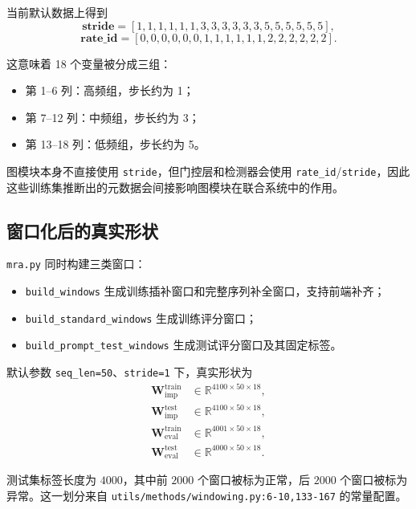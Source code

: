 \documentclass[UTF8]{ctexart}
\begin{document}
当前默认数据上得到
\begin{equation}
    \bm{stride} = [1,1,1,1,1,1,3,3,3,3,3,3,5,5,5,5,5,5],
\end{equation}
\begin{equation}
    \bm{rate\_id} = [0,0,0,0,0,0,1,1,1,1,1,1,2,2,2,2,2,2].
\end{equation}

这意味着 18 个变量被分成三组：
\begin{itemize}
    \item 第 1--6 列：高频组，步长约为 1；
    \item 第 7--12 列：中频组，步长约为 3；
    \item 第 13--18 列：低频组，步长约为 5。
\end{itemize}

图模块本身不直接使用 \verb|stride|，但门控层和检测器会使用 \verb|rate_id|/\verb|stride|，因此这些训练集推断出的元数据会间接影响图模块在联合系统中的作用。

\subsection{窗口化后的真实形状}

\verb|mra.py| 同时构建三类窗口：
\begin{itemize}
    \item \verb|build_windows| 生成训练插补窗口和完整序列补全窗口，支持前端补齐；
    \item \verb|build_standard_windows| 生成训练评分窗口；
    \item \verb|build_prompt_test_windows| 生成测试评分窗口及其固定标签。
\end{itemize}

默认参数 \verb|seq_len=50|、\verb|stride=1| 下，真实形状为
\begin{align}
    \bm{W}^{\text{train}}_{\text{imp}} &\in \mathbb{R}^{4100 \times 50 \times 18}, \\
    \bm{W}^{\text{test}}_{\text{imp}} &\in \mathbb{R}^{4100 \times 50 \times 18}, \\
    \bm{W}^{\text{train}}_{\text{eval}} &\in \mathbb{R}^{4001 \times 50 \times 18}, \\
    \bm{W}^{\text{test}}_{\text{eval}} &\in \mathbb{R}^{4000 \times 50 \times 18}.
\end{align}

测试集标签长度为 \(4000\)，其中前 \(2000\) 个窗口被标为正常，后 \(2000\) 个窗口被标为异常。这一划分来自 \verb|utils/methods/windowing.py:6-10,133-167| 的常量配置。
\end{document}
